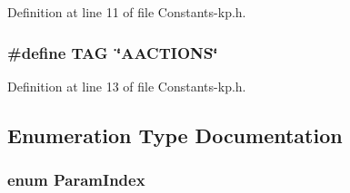 Definition at line 11 of file Constants-\/kp.\-h.

\hypertarget{_constants-kp_8h_afc3d101f633a076cc1ca84b85b6224b2}{
\subsubsection[{T\-A\-G}]{\setlength{\rightskip}{0pt plus 5cm}\#define T\-A\-G~\char`\"{}A\-A\-C\-T\-I\-O\-N\-S\char`\"{}}}\label{_constants-kp_8h_afc3d101f633a076cc1ca84b85b6224b2}


Definition at line 13 of file Constants-\/kp.\-h.



\subsection{Enumeration Type Documentation}
\hypertarget{_constants-kp_8h_af89f32402083cdbd7f66ce3f92580c89}{
\subsubsection[{Param\-Index}]{\setlength{\rightskip}{0pt plus 5cm}enum {\bf Param\-Index}}}\label{_constants-kp_8h_af89f32402083cdbd7f66ce3f92580c89}
